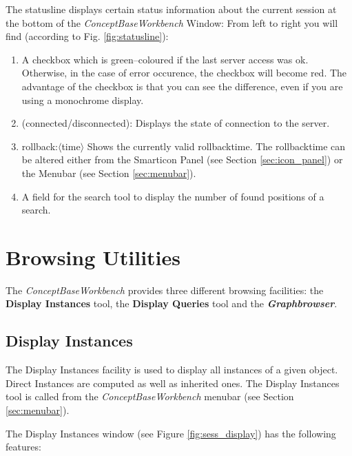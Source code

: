 The statusline displays certain status information about the current session at the bottom of the {\em ConceptBase\/Workbench}  Window:
From left to right you will find (according to Fig. \ref{fig:statusline}):
\begin{enumerate}
\item A checkbox which is green--coloured if the last server access was ok. Otherwise, in the case of error occurence, the checkbox will become red. The advantage of the checkbox is that you can see the difference, even if you are using a monochrome display.
\item (connected/disconnected): Displays the state of  connection to the server.
\item rollback:$\langle $time$\rangle $ Shows the currently valid rollbacktime. The rollbacktime can be altered either from the Smarticon Panel (see Section \ref{sec:icon_panel}) or the Menubar (see Section \ref{sec:menubar}).
\item A field for the search tool to display the number of found positions of a search.
\end{enumerate}



\section{Browsing Utilities}

The {\em ConceptBase\/Workbench}  provides three different browsing facilities: the {\bf Display Instances} tool, the {\bf Display Queries} tool and the {\bf {\em Graphbrowser}}. 

\subsection{Display Instances}				\label{sec:displayinstances}
The Display Instances facility is used to display all instances of a given object.  Direct Instances are computed as well as inherited ones. The Display Instances tool is called from the {\em ConceptBase\/Workbench}  menubar (see Section \ref{sec:menubar}). 

The Display Instances window (see Figure \ref{fig:sess_display}) has the following features:

